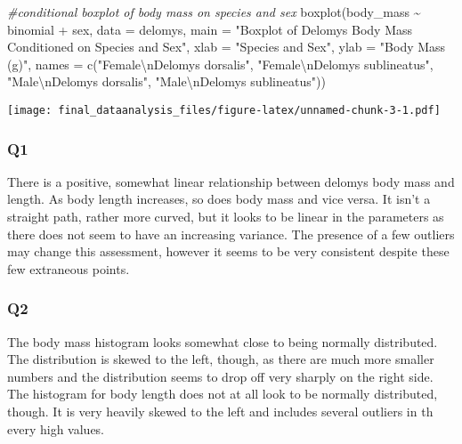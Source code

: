 \documentclass[
]{article}
\newenvironment{Shaded}{\begin{snugshade}}{\end{snugshade}}
\newcommand{\AttributeTok}[1]{\textcolor[rgb]{0.77,0.63,0.00}{#1}}
\newcommand{\CommentTok}[1]{\textcolor[rgb]{0.56,0.35,0.01}{\textit{#1}}}
\newcommand{\FunctionTok}[1]{\textcolor[rgb]{0.00,0.00,0.00}{#1}}
\newcommand{\NormalTok}[1]{#1}
\newcommand{\SpecialCharTok}[1]{\textcolor[rgb]{0.00,0.00,0.00}{#1}}
\newcommand{\StringTok}[1]{\textcolor[rgb]{0.31,0.60,0.02}{#1}}
\begin{document}
\begin{Shaded}
\begin{Highlighting}[]
\CommentTok{\#conditional boxplot of body mass on species and sex}
\FunctionTok{boxplot}\NormalTok{(body\_mass }\SpecialCharTok{\textasciitilde{}}\NormalTok{ binomial }\SpecialCharTok{+}\NormalTok{ sex, }\AttributeTok{data =}\NormalTok{ delomys,}
        \AttributeTok{main =} \StringTok{"Boxplot of Delomys Body Mass Conditioned on Species and Sex"}\NormalTok{,}
        \AttributeTok{xlab =} \StringTok{"Species and Sex"}\NormalTok{,}
        \AttributeTok{ylab =} \StringTok{"Body Mass (g)"}\NormalTok{,}
        \AttributeTok{names =} \FunctionTok{c}\NormalTok{(}\StringTok{"Female}\SpecialCharTok{\textbackslash{}n}\StringTok{Delomys dorsalis"}\NormalTok{, }\StringTok{"Female}\SpecialCharTok{\textbackslash{}n}\StringTok{Delomys sublineatus"}\NormalTok{, }\StringTok{"Male}\SpecialCharTok{\textbackslash{}n}\StringTok{Delomys dorsalis"}\NormalTok{, }\StringTok{"Male}\SpecialCharTok{\textbackslash{}n}\StringTok{Delomys sublineatus"}\NormalTok{))}
\end{Highlighting}
\end{Shaded}

\texttt{[image: final\_dataanalysis\_files/figure-latex/unnamed-chunk-3-1.pdf]}

\hypertarget{q1}{%
\subsubsection{Q1}\label{q1}}

There is a positive, somewhat linear relationship between delomys body
mass and length. As body length increases, so does body mass and vice
versa. It isn't a straight path, rather more curved, but it looks to be
linear in the parameters as there does not seem to have an increasing
variance. The presence of a few outliers may change this assessment,
however it seems to be very consistent despite these few extraneous
points.

\hypertarget{q2}{%
\subsubsection{Q2}\label{q2}}

The body mass histogram looks somewhat close to being normally
distributed. The distribution is skewed to the left, though, as there
are much more smaller numbers and the distribution seems to drop off
very sharply on the right side. The histogram for body length does not
at all look to be normally distributed, though. It is very heavily
skewed to the left and includes several outliers in th every high
values.
\end{document}

